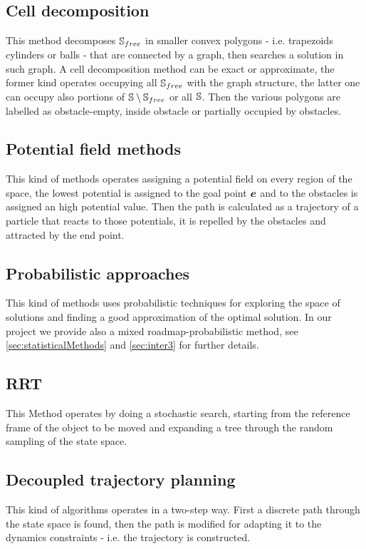 \documentclass[dissertation.tex]{subfiles}
\begin{document}
\subsection{Cell decomposition}
This method decomposes $\mathbb{S}_{free}$ in smaller convex polygons - i.e.
trapezoids cylinders or balls - that
are connected by a graph, then searches a solution in such graph. A cell
decomposition method can be exact
or approximate, the former kind operates occupying all
$\mathbb{S}_{free}$ with the graph structure, the latter one can occupy also
portions of
$\mathbb{S}\setminus\mathbb{S}_{free}$ or all $\mathbb{S}$. Then the various polygons are
labelled as obstacle-empty, inside obstacle or partially occupied by
obstacles.

\subsection{Potential field methods}
This kind of methods operates assigning a potential field on every
region of the space, the lowest potential is assigned to the goal
point $\boldsymbol{e}$ and to the obstacles is assigned an high potential
value. Then the path is calculated as a trajectory of a particle that
reacts to those potentials, it is repelled by the obstacles and
attracted by the end point.

\subsection{Probabilistic approaches}
This kind of methods uses probabilistic techniques for exploring the
space of solutions and finding a good approximation of the optimal
solution. In our project we provide also a mixed
roadmap-probabilistic method, see \cref{sec:statisticalMethods} and
\cref{sec:inter3} for further details.

\subsection{\acf{RRT}}
This Method operates by doing a stochastic search, starting from the
reference frame of the object to be moved and expanding a tree through the
random sampling of the state space.

\subsection{Decoupled trajectory planning}
This kind of algorithms operates in a two-step way. First a
discrete path through the state space is found, then the path is modified for
adapting it to the dynamics constraints - i.e. the trajectory is constructed.
\end{document}
